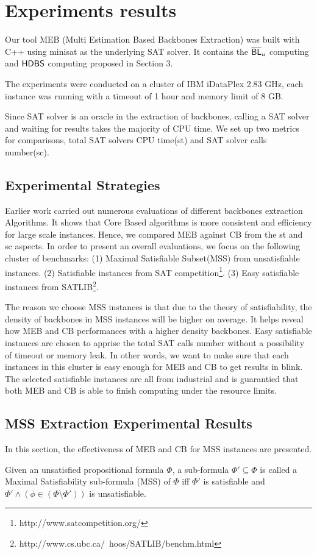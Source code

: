 \section{Experiments results}\label{sec:expr}

Our tool MEB (Multi Estimation Based Backbones Extraction) was built with C++ using minisat\cite{MINISAT} as the underlying SAT solver. It contains the $\overline{\textsf{BL}}_u$ computing and $\textsf{HDBS}$ computing proposed in Section 3. 

The experiments were conducted on a cluster of IBM iDataPlex 2.83 GHz, each instance was running with a timeout of 1 hour and memory limit of 8 GB.

Since SAT solver is an oracle in the extraction of backbones, calling a SAT solver and waiting for results takes the majority of CPU time. We set up two metrics for comparisons, total SAT solvers CPU time(st) and SAT solver calls number(sc).

\subsection{Experimental Strategies}

Earlier work\cite{JLM15} carried out numerous evaluations of different backbones extraction Algorithms. It shows that Core Based algorithms is more consistent and efficiency for large scale instances. Hence, we compared MEB against CB from the st and sc aspects.
In order to present an overall evaluations, we focus on the following cluster of benchmarks: (1) Maximal Satisfiable Subset(MSS) from unsatisfiable instances. (2) Satisfiable instances from SAT competition\footnote{http://www.satcompetition.org/}. (3) Easy satisfiable instances from SATLIB\footnote{http://www.cs.ubc.ca/~hoos/SATLIB/benchm.html}.

The reason we choose MSS instances is that due to the theory of satisfiability, the density of backbones in MSS instances will be higher on average. It helps reveal how MEB and CB performances with a higher density backbones.
Easy satisfiable instances are chosen to apprise the total SAT calls number without a possibility of timeout or memory leak. In other words, we want to make sure that each instances in this cluster is easy enough for MEB and CB to get results in blink.
The selected satisfiable instances are all from industrial and is guarantied that both MEB and CB is able to finish computing under the resource limits.

\subsection{MSS Extraction Experimental Results}
In this section, the effectiveness of MEB and CB for MSS instances are presented.
\begin{definition}
Given an unsatisfied propositional formula $\Phi$, a sub-formula $\Phi'\subseteq\Phi$ is called a Maximal Satisfiability sub-formula (MSS) of $\Phi$ iff $\Phi'$ is satisfiable and $\Phi'\wedge(\phi\in(\Phi\setminus\Phi'))$ is unsatisfiable.
\end{definition}

